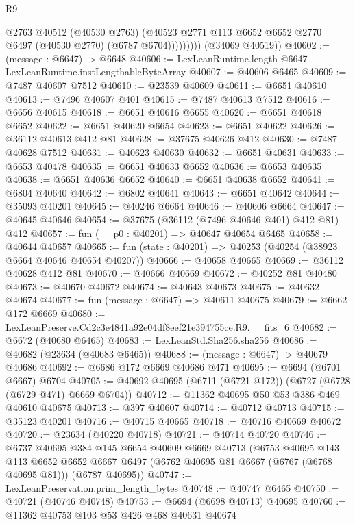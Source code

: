 \begin{lexlean}{R9}
\begin{coremodule}
                    @2763
                    @40512
                    (@40530 @2763)
                    (@40523 @2771 @113 @6652 @6652 @2770 @6497 (@40530 @2770) (@6787 @6704)))))))))
      (@34069 @40519))
@40602 := (message : @6647) -> @6648
@40606 := LexLeanRuntime.length @6647 LexLeanRuntime.instLengthableByteArray
@40607 := @40606 @6465
@40609 := @7487 @40607 @7512
@40610 := @23539 @40609
@40611 := @6651 @40610
@40613 := @7496 @40607 @401
@40615 := @7487 @40613 @7512
@40616 := @6656 @40615
@40618 := @6651 @40616 @6655
@40620 := @6651 @40618 @6652
@40622 := @6651 @40620 @6654
@40623 := @6651 @40622
@40626 := @36112 @40613 @412 @81
@40628 := @37675 @40626 @412
@40630 := @7487 @40628 @7512
@40631 := @40623 @40630
@40632 := @6651 @40631
@40633 := @6653 @40478
@40635 := @6651 @40633 @6652
@40636 := @6653 @40635
@40638 := @6651 @40636 @6652
@40640 := @6651 @40638 @6652
@40641 := @6804 @40640
@40642 := @6802 @40641
@40643 := @6651 @40642
@40644 := @35093 @40201
@40645 := @40246 @6664
@40646 := @40606 @6664
@40647 := @40645 @40646
@40654 := @37675 (@36112 (@7496 @40646 @401) @412 @81) @412
@40657 := fun (__p0 : @40201) => @40647 @40654 @6465
@40658 := @40644 @40657
@40665 := fun (state : @40201) => @40253 (@40254 (@38923 @6664 @40646 @40654 @40207))
@40666 := @40658 @40665
@40669 := @36112 @40628 @412 @81
@40670 := @40666 @40669
@40672 := @40252 @81 @40480
@40673 := @40670 @40672
@40674 := @40643 @40673
@40675 := @40632 @40674
@40677 := fun (message : @6647) => @40611 @40675
@40679 := @6662 @172 @6669
@40680 := LexLeanPreserve.Cd2c3e4841a92e04df8eef21e394755ce.R9.__fits_6
@40682 := @6672 (@40680 @6465)
@40683 := LexLeanStd.Sha256.sha256
@40686 := @40682 (@23634 (@40683 @6465))
@40688 := (message : @6647) -> @40679 @40686
@40692 := @6686 @172 @6669 @40686 @471
@40695 := @6694 (@6701 @6667) @6704
@40705 := @40692 @40695 (@6711 (@6721 @172)) (@6727 (@6728 (@6729 @471) @6669 @6704))
@40712 := @11362 @40695 @50 @53 @386 @469 @40610 @40675
@40713 := @397 @40607
@40714 := @40712 @40713
@40715 := @35123 @40201
@40716 := @40715 @40665
@40718 := @40716 @40669 @40672
@40720 := @23634 (@40220 @40718)
@40721 := @40714 @40720
@40746 := @6737
    @40695
    @384
    @145
    @6654
    @40609
    @6669
    @40713
    (@6753
      @40695
      @143
      @113
      @6652
      @6652
      @6667
      @6497
      (@6762 @40695 @81 @6667 (@6767 (@6768 @40695 @81)))
      (@6787 @40695))
@40747 := LexLeanPreservation.prim_length_bytes
@40748 := @40747 @6465
@40750 := @40721 (@40746 @40748)
@40753 := @6694 (@6698 @40713) @40695
@40760 := @11362 @40753 @103 @53 @426 @468 @40631 @40674

\end{coremodule}
\end{lexlean}
